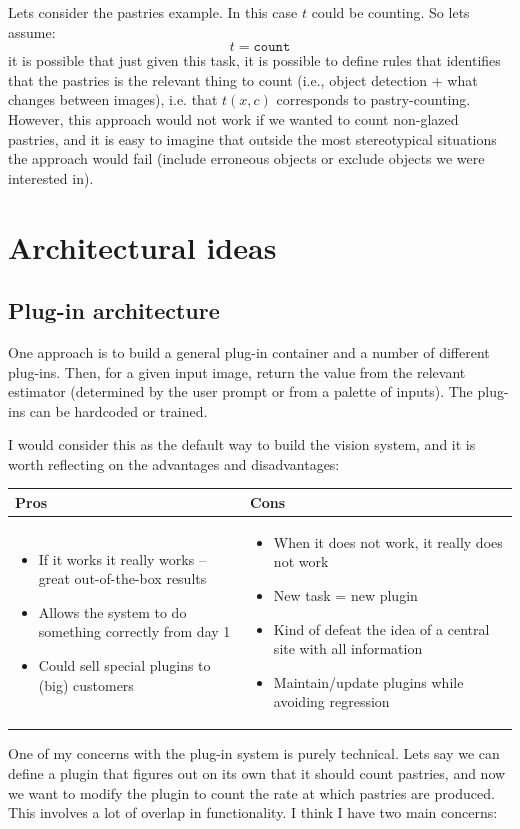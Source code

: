 \documentclass{article}
\begin{document}
Lets consider the pastries example. In this case $t$ could be counting. So lets assume:
$$
t = \texttt{count}
$$
it is possible that just given this task, it is possible to define rules that identifies that the pastries is the relevant thing to count (i.e., object detection + what changes between images), i.e. that $t(x, c)$ corresponds to pastry-counting. However, this approach would not work if we wanted to count non-glazed pastries, and it is easy to imagine that outside the most stereotypical situations the approach would fail (include erroneous objects or exclude objects we were interested in). 




\section{Architectural ideas}


\subsection{Plug-in architecture}
One approach is to build a general plug-in container and a number of different plug-ins. Then, for a given input image, return the value from the relevant estimator (determined by the user prompt or from a palette of inputs). The plug-ins can be hardcoded or trained.

I would consider this as the default way to build the vision system, and it is worth reflecting on the advantages and disadvantages:

\begin{center}
\begin{tabular}{|p{.45\linewidth}|p{.45\linewidth}|}
\hline
\textbf{Pros} & \textbf{Cons} \\
\hline
\begin{itemize}
    \item If it works it really works -- great out-of-the-box results
    \item Allows the system to do something correctly from day 1
    \item Could sell special plugins to (big) customers    
\end{itemize} &
\begin{itemize}
    \item When it does not work, it really does not work
    \item New task = new plugin
    \item Kind of defeat the idea of a central site with all information    
    \item Maintain/update plugins while avoiding regression
\end{itemize} \\
\hline
\end{tabular}
\end{center}
One of my concerns with the plug-in system is purely technical. Lets say we can define a plugin that figures out on its own that it should count pastries, and now we want to modify the plugin to count the rate at which pastries are produced. This involves a lot of overlap in functionality.  I think I have two main concerns:
\end{document}
